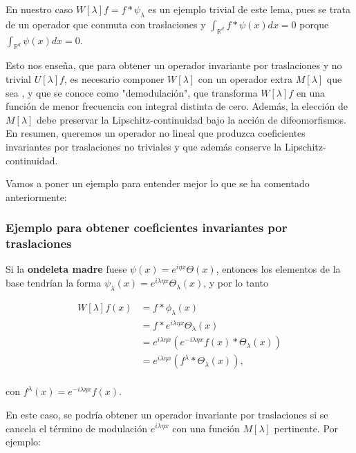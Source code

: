 \noindent En nuestro caso $W[\lambda]f=f\ast\psi_\lambda$ es un ejemplo trivial de este lema, pues se trata de un operador que conmuta con traslaciones y $\int_{\mathbb{R}^d} f \ast \psi(x) dx=0$ porque $\int_{\mathbb{R}^d} \psi(x)dx=0$.

\medskip

\noindent Esto nos enseña, que para obtener un operador invariante por traslaciones y no trivial $U[\lambda]f$, es necesario componer $W[\lambda]$ con un operador extra $M[\lambda]$ que sea , y que se conoce como "demodulación", que transforma $W[\lambda]f$ en una función de menor frecuencia con integral distinta de cero. Además, la elección de $M[\lambda]$ debe preservar la Lipschitz-continuidad bajo la acción de difeomorfismos.    
En resumen, queremos un operador no lineal que produzca coeficientes invariantes por traslaciones no triviales y que además conserve la Lipschitz-continuidad.


\medskip

\noindent Vamos a poner un ejemplo para entender mejor lo que se ha comentado anteriormente: 

\subsubsection{Ejemplo para obtener coeficientes invariantes por traslaciones}

\noindent Si la \textbf{ondeleta madre} fuese $\psi(x)=e^{i\eta x}\Theta(x)$, entonces los elementos de la base tendrían la forma $\psi_\lambda(x)=e^{i\lambda\eta x}\Theta_\lambda(x)$, y por lo tanto 

\begin{align*}
  W[\lambda]f(x) &= f \ast \phi_\lambda (x) \\
  &= f \ast e^{i\lambda\eta x}\Theta_\lambda(x) \\
  &=e^{i\lambda\eta x}(e^{-i\lambda\eta x}f(x) \ast \Theta_\lambda(x)) \\
  &=e^{i\lambda\eta x}(f^\lambda \ast \Theta_\lambda(x)),\\
\end{align*}

\noindent con $f^\lambda(x)=e^{-i\lambda\eta x}f(x)$.

\medskip

\noindent En este caso, se podría obtener un operador invariante por traslaciones si se cancela el término de modulación $e^{i\lambda\eta x}$ con una función $M[\lambda]$ pertinente. Por ejemplo: 

